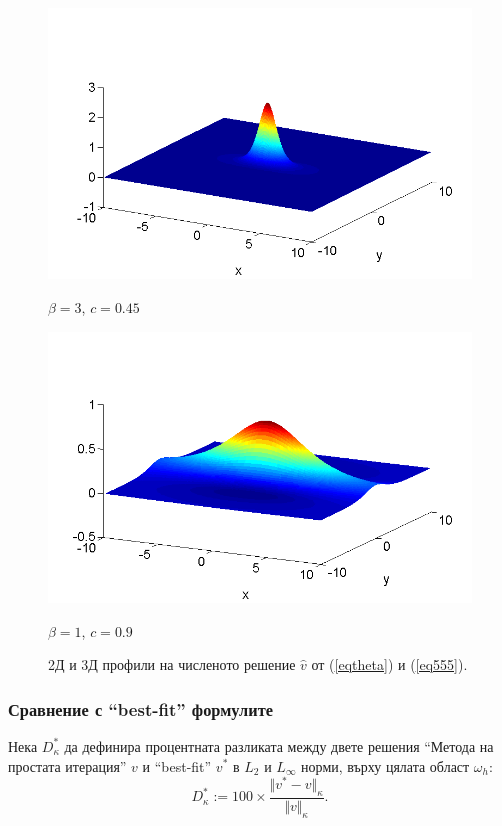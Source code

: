 \documentclass{beamer}
\newcommand{\rf}[1]{(\ref{#1})}
\begin{document}
\begin{frame}
\begin{figure}[ht]
\begin{minipage}[b]{0.45\linewidth}
		 \raggedleft
		\includegraphics[width=\linewidth]{../Thesis/SolutionView/ChristovIC_30_bt3_c045_prpview.png}		
		\centerline{$\beta = 3$, $c = 0.45$ }
	\end{minipage}
	\begin{minipage}[b]{0.45\linewidth}
		 \raggedright
		\includegraphics[width=\linewidth]{../Thesis/SolutionView/ChristovIC_128_bt1_c090_prpview.png}
		\centerline{$\beta = 1$, $c = 0.9$}
	\end{minipage}
	\caption{2Д и 3Д профили на численото решение $\widehat v$ от \rf{eqtheta} и \rf{eq555}.}
	\label{fig:solutions}
\end{figure}

\end{frame}

\begin{frame}
\frametitle{Сравнение с ``best-fit'' формулите}

Нека $D^*_{\kappa}$ да дефинира процентната разликата между двете решения  ``Метода на простата итерация'' $v$ и ``best-fit'' $v^*$ в ${L_2 }$ и ${L_\infty}$ норми, върху цялата област $\omega_h$:
\begin{equation}\label{diffvv}
D^*_{\kappa} := 100 \times \frac{\Vert v^*-v \Vert_{\kappa} }{ \Vert v \Vert_{\kappa} }.
\end{equation}
\end{frame}
\end{document}
